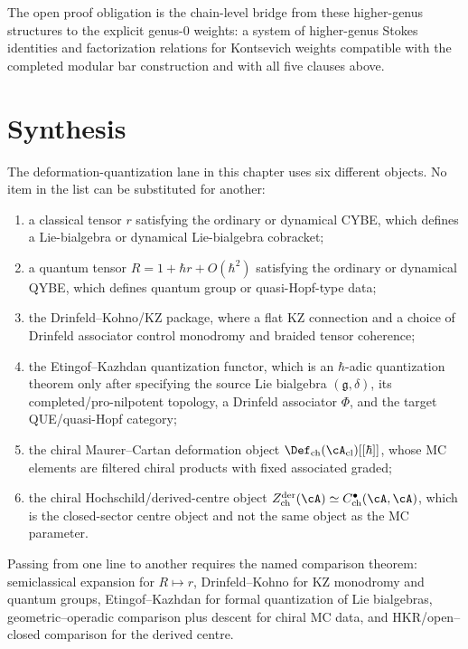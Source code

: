 The open proof obligation is the chain-level bridge from these
higher-genus structures to the explicit genus-$0$ weights: a system
of higher-genus Stokes identities and factorization relations for
Kontsevich weights compatible with the completed modular bar
construction and with all five clauses above.

\section{Synthesis}
\label{sec:defq-supplement}

\begin{proposition}
\label{prop:defq-data-firewall}
\ClaimStatusProvedHere
{}
The deformation-quantization lane in this chapter uses six different
objects. No item in the list can be substituted for another:
\begin{enumerate}[label=\textup{(\roman*)}]
\item a classical tensor \(r\) satisfying the ordinary or dynamical
CYBE, which defines a Lie-bialgebra or dynamical Lie-bialgebra
cobracket;
\item a quantum tensor \(R=1+\hbar r+O(\hbar^2)\) satisfying the
ordinary or dynamical QYBE, which defines quantum group or
quasi-Hopf-type data;
\item the Drinfeld--Kohno/KZ package, where a flat KZ connection and a
choice of Drinfeld associator control monodromy and braided tensor
coherence;
\item the Etingof--Kazhdan quantization functor, which is an
\(\hbar\)-adic quantization theorem only after specifying the source
Lie bialgebra \((\mathfrak g,\delta)\), its completed/pro-nilpotent
topology, a Drinfeld associator \(\Phi\), and the target
QUE/quasi-Hopf category;
\item the chiral Maurer--Cartan deformation object
\(\Def_{\mathrm{ch}}(\cA_{\mathrm{cl}})[[\hbar]]\), whose MC elements
are filtered chiral products with fixed associated graded;
\item the chiral Hochschild/derived-centre object
\(Z^{\mathrm{der}}_{\mathrm{ch}}(\cA)\simeq
C^\bullet_{\mathrm{ch}}(\cA,\cA)\), which is the closed-sector centre
object and not the same object as the MC parameter.
\end{enumerate}
Passing from one line to another requires the named comparison theorem:
semiclassical expansion for \(R\mapsto r\), Drinfeld--Kohno
for KZ monodromy and quantum groups, Etingof--Kazhdan for formal
quantization of Lie bialgebras, geometric--operadic comparison plus
descent for chiral MC data, and HKR/open--closed comparison for the
derived centre.
\end{proposition}

